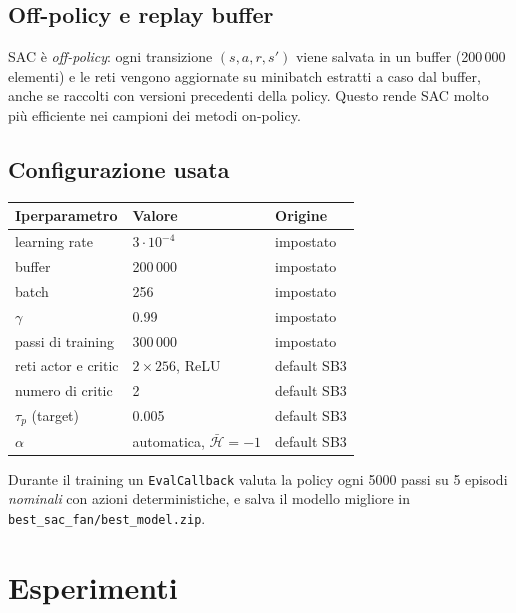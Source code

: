 \documentclass[11pt,a4paper]{article}
\newcommand{\code}[1]{\texttt{\small #1}}
\newcommand{\envfile}{../../controller/env_fan.py}
\newcommand{\envlines}[2]{}
\begin{document}
\subsection{Off-policy e replay buffer}
SAC è \emph{off-policy}: ogni transizione $(s,a,r,s')$ viene salvata in un buffer (200\,000 elementi)
e le reti vengono aggiornate su minibatch estratti a caso dal buffer, anche se raccolti con versioni
precedenti della policy. Questo rende SAC molto più efficiente nei campioni dei metodi on-policy.

\subsection{Configurazione usata}
\envlines{357}{369}
\begin{center}
\begin{tabular}{@{}lll@{}}
\toprule
Iperparametro & Valore & Origine\\
\midrule
learning rate & $3\cdot10^{-4}$ & impostato\\
buffer & 200\,000 & impostato\\
batch & 256 & impostato\\
$\gamma$ & 0.99 & impostato\\
passi di training & 300\,000 & impostato\\
reti actor e critic & $2\times256$, ReLU & default SB3\\
numero di critic & 2 & default SB3\\
$\tau_p$ (target) & 0.005 & default SB3\\
$\alpha$ & automatica, $\bar{\mathcal{H}} = -1$ & default SB3\\
\bottomrule
\end{tabular}
\end{center}
Durante il training un \code{EvalCallback} valuta la policy ogni 5000 passi su 5 episodi
\emph{nominali} con azioni deterministiche, e salva il modello migliore in
\code{best\_sac\_fan/best\_model.zip}.

\section{Esperimenti}
\label{sec:esperimenti}
\end{document}

